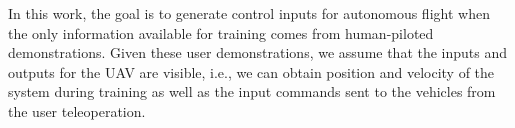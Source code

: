 \documentclass[letterpaper, 10 pt, conference]{ieeeconf}  %
\newcommand\NB[1]{$\spadesuit$\footnote{NB: #1}}
\begin{document}
In this work, the goal is to generate control inputs for autonomous flight when the only information available for training comes from human-piloted demonstrations. Given these user demonstrations, we assume that the inputs and outputs for the UAV are visible, i.e., we can obtain position and velocity of the system during training as well as the input commands sent to the vehicles from the user teleoperation. 

\end{document}
